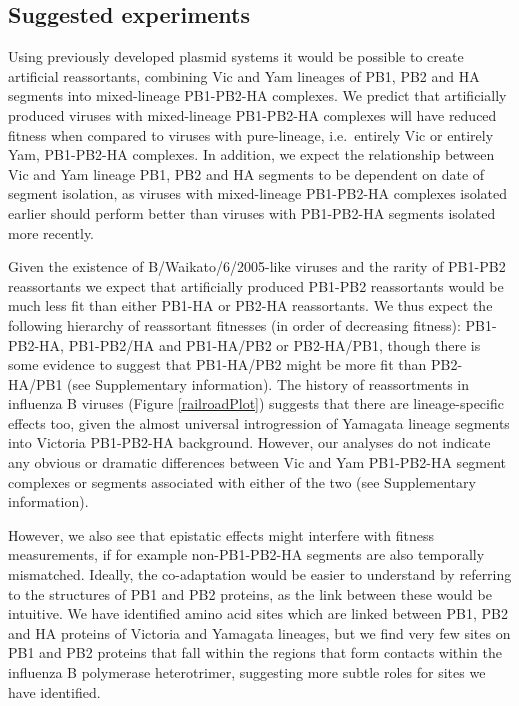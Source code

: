 \documentclass[11pt,oneside,letterpaper]{article}
\begin{document}
\subsection*{Suggested experiments}
Using previously developed plasmid systems \cite{hoffmann2002} it would be possible to create artificial reassortants, combining Vic and Yam lineages of PB1, PB2 and HA segments into mixed-lineage PB1-PB2-HA complexes.
We predict that artificially produced viruses with mixed-lineage PB1-PB2-HA complexes will have reduced fitness when compared to viruses with pure-lineage, i.e.\ entirely Vic or entirely Yam, PB1-PB2-HA complexes.
In addition, we expect the relationship between Vic and Yam lineage PB1, PB2 and HA segments to be dependent on date of segment isolation, as viruses with mixed-lineage PB1-PB2-HA complexes isolated earlier should perform better than viruses with PB1-PB2-HA segments isolated more recently.

Given the existence of B/Waikato/6/2005-like viruses and the rarity of PB1-PB2 reassortants we expect that artificially produced PB1-PB2 reassortants would be much less fit than either PB1-HA or PB2-HA reassortants.
We thus expect the following hierarchy of reassortant fitnesses (in order of decreasing fitness): PB1-PB2-HA, PB1-PB2/HA and PB1-HA/PB2 or PB2-HA/PB1, though there is some evidence to suggest that PB1-HA/PB2 might be more fit than PB2-HA/PB1 (see Supplementary information).
The history of reassortments in influenza B viruses (Figure \ref{railroadPlot}) suggests that there are lineage-specific effects too, given the almost universal introgression of Yamagata lineage segments into Victoria PB1-PB2-HA background.
However, our analyses do not indicate any obvious or dramatic differences between Vic and Yam PB1-PB2-HA segment complexes or segments associated with either of the two (see Supplementary information).

However, we also see that epistatic effects might interfere with fitness measurements, if for example non-PB1-PB2-HA segments are also temporally mismatched.
Ideally, the co-adaptation would be easier to understand by referring to the structures of PB1 and PB2 proteins, as the link between these would be intuitive.
We have identified amino acid sites which are linked between PB1, PB2 and HA proteins of Victoria and Yamagata lineages, but we find very few sites on PB1 and PB2 proteins that fall within the regions that form contacts within the influenza B polymerase heterotrimer, suggesting more subtle roles for sites we have identified.
\end{document}
